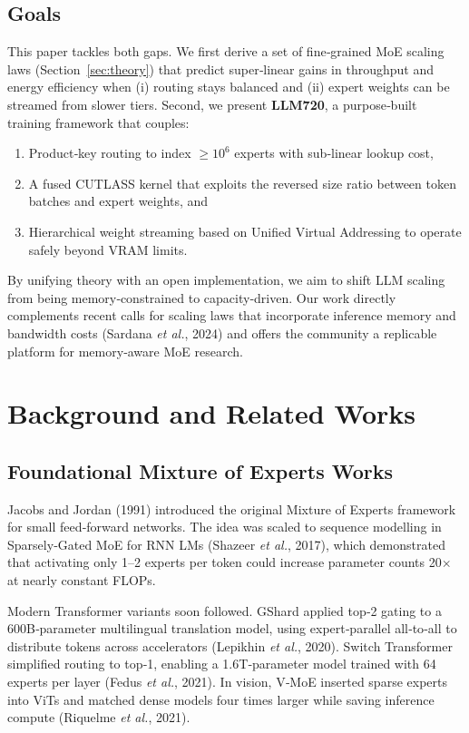 \documentclass[11pt]{article}
\begin{document}
\subsection{Goals}
This paper tackles both gaps. We first derive a set of fine‑grained MoE scaling laws
(Section~\ref{sec:theory}) that predict super‑linear gains in throughput and energy efficiency
when (i) routing stays balanced and (ii) expert weights can be streamed from slower tiers.
Second, we present \textbf{LLM720}, a purpose‑built training framework that couples:
\begin{enumerate}
  \item Product‑key routing to index $\ge10^6$ experts with sub‑linear lookup cost,
  \item A fused CUTLASS kernel that exploits the reversed size ratio between token batches and
    expert weights, and
  \item Hierarchical weight streaming based on Unified Virtual Addressing to operate safely
    beyond VRAM limits.
\end{enumerate}
By unifying theory with an open implementation, we aim to shift LLM scaling from being
memory‑constrained to capacity‑driven. Our work directly complements recent calls for
scaling laws that incorporate inference memory and bandwidth costs (Sardana \emph{et al.}, 2024)
and offers the community a replicable platform for memory‑aware MoE research.

\section{Background and Related Works}
\subsection{Foundational Mixture of Experts Works}
Jacobs and Jordan (1991) introduced the original Mixture of Experts framework for small
feed‑forward networks. The idea was scaled to sequence modelling in Sparsely‑Gated MoE for
RNN LMs (Shazeer \emph{et al.}, 2017), which demonstrated that activating only 1–2 experts per token
could increase parameter counts 20$\times$ at nearly constant FLOPs.

Modern Transformer variants soon followed. GShard applied top‑2 gating to a 600B‑parameter
multilingual translation model, using expert‑parallel all‑to‑all to distribute tokens across
accelerators (Lepikhin \emph{et al.}, 2020). Switch Transformer simplified routing to top‑1,
enabling a 1.6T‑parameter model trained with 64 experts per layer (Fedus \emph{et al.}, 2021). In
vision, V‑MoE inserted sparse experts into ViTs and matched dense models four times larger
while saving inference compute (Riquelme \emph{et al.}, 2021).
\end{document}
